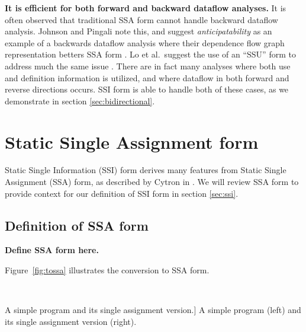\documentclass[12pt,titlepage,twoside]{article}
\let\oldsection\section
\renewcommand{\section}{\setcounter{figure}{0}\oldsection}
\begin{document}
\textbf{It is efficient for both forward and backward dataflow analyses.}
It is often observed that traditional SSA form cannot handle backward
dataflow analysis.  Johnson and Pingali note this, and suggest
\emph{anticipatability} as an example of a backwards dataflow analysis
where their dependence flow graph representation betters SSA form
\cite{johnson93:dfg}. Lo et al.\ suggest the use of an ``SSU'' form to
address much the same issue \cite{lo98:ssu}.  There are in fact many
analyses where both use and definition information is utilized, and
where dataflow in both forward and reverse directions occurs.  SSI
form is able to handle both of these cases, as we demonstrate in
section \ref{sec:bidirectional}.

\section{Static Single Assignment form}\label{sec:ssa}
Static Single Information (SSI) form derives many features from Static
Single Assignment (SSA) form, as described by Cytron in
\cite{cytron89:ssa}.  We will review SSA form to provide context for
our definition of SSI form in section \ref{sec:ssi}.

\subsection{Definition of SSA form}

\textbf{Define SSA form here.}

Figure~\vref{fig:tossa} illustrates the conversion to SSA form.
\begin{myfigure}
\begin{center}
 \vline\ 
\end{center}
\caption
[A simple program and its single assignment version.]
{A simple program (left) and its single assignment version (right).
\label{fig:tossa}}
\end{myfigure}
\end{document}
